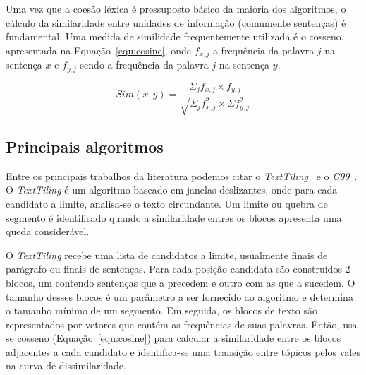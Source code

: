 
Uma vez que a coesão léxica é pressuposto básico da maioria dos algoritmos, o cálculo da similaridade entre unidades de informação (comumente sentenças) é fundamental. Uma medida de similidade frequentemente utilizada é o cosseno, apresentada na Equação~\ref{equ:cosine}, onde $f_{x,j}$ a frequência da palavra $j$ na sentença $x$ e $f_{y,j}$ sendo a frequência da palavra $j$ na sentença $y$.


\begin{equation}
Sim(x,y) = \frac
{\Sigma_j f_{x,j} \times f_{y,j}}
{\sqrt{\Sigma_j f^2_{x,j} \times \Sigma f^2_{y,j}}}
\label{equ:cosine}
\end{equation}


\subsection{Principais algoritmos}
	\label{subsec:principaisalgoritimos}

Entre os principais trabalhos da literatura podemos citar o  \textit{TextTiling}~\cite{Hearst1994} e o \textit{C99}~\cite{Choi2000}.
%
O \textit{TextTiling} é um algoritmo baseado em janelas deslizantes, onde para cada candidato a limite, analisa-se o texto circundante. Um limite ou quebra de segmento é identificado quando a similaridade entres os blocos apresenta uma queda considerável.


O \textit{TextTiling} recebe uma lista de candidatos a limite, usualmente finais de parágrafo ou finais de sentenças. Para cada posição candidata são construídos 2 blocos, um contendo sentenças que a precedem e outro com as que a sucedem. O tamanho desses blocos é um parâmetro a ser fornecido ao algoritmo e determina o tamanho mínimo de um segmento.
%
Em seguida, os blocos de texto são representados por vetores que contém as frequências de suas palavras. Então, usa-se cosseno (Equação~\ref{equ:cosine}) para calcular a similaridade entre os blocos adjacentes a cada candidato e identifica-se uma transição entre tópicos pelos vales na curva de dissimilaridade.

